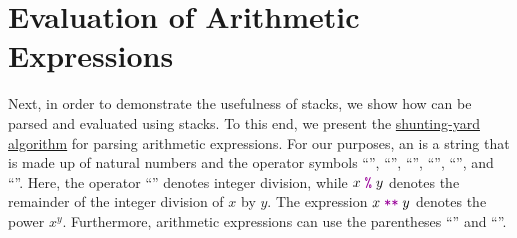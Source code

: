 \section{Evaluation of Arithmetic Expressions}
Next, in order to demonstrate the usefulness of stacks, we show how  can be
parsed and evaluated using stacks.  To this end, we present the
\href{https://en.wikipedia.org/wiki/Shunting-yard_algorithm}{shunting-yard algorithm}
 for parsing arithmetic expressions.  
For our purposes, an  is a string that is made up of natural numbers and
the operator symbols ``\mytt{+}'', ``\mytt{-}'', ``\mytt{*}'', ``\mytt{/}'',
``'', and ``\mytt{**}''. Here, the operator ``\mytt{/}'' denotes integer division,
while $x \;\mytt{\symbol{37}}\; y$ denotes the remainder of the integer division of $x$ by $y$.  The expression $x\;\mytt{**}\;y$ denotes the power $x^y$.
Furthermore, arithmetic expressions can use the parentheses ``\mytt{(}'' and ``\mytt{)}''.
  
